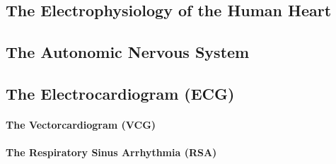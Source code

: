 \subsection{The Electrophysiology of the Human Heart}
\label{physiology}



\subsection{The Autonomic Nervous System}
\label{ans}



\subsection{The Electrocardiogram (ECG)}
\label{ecg}
\paragraph{The Vectorcardiogram (VCG)}
\label{vcg}
\paragraph{The Respiratory Sinus Arrhythmia (RSA)}
\label{rsa}

